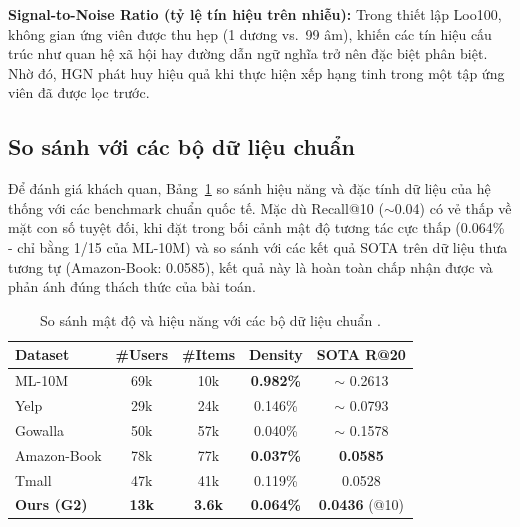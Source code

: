 \documentclass[11pt]{article}
\newcommand{\tabref}[1]{Bảng~\ref{#1}}
\begin{document}
\textbf{Signal-to-Noise Ratio (tỷ lệ tín hiệu trên nhiễu):}
Trong thiết lập Loo100, không gian ứng viên được thu hẹp (1 dương vs.\ 99 âm),
khiến các tín hiệu cấu trúc như quan hệ xã hội hay đường dẫn ngữ nghĩa
trở nên đặc biệt phân biệt.
Nhờ đó, HGN phát huy hiệu quả khi thực hiện xếp hạng tinh trong
một tập ứng viên đã được lọc trước.

\subsection{So sánh với các bộ dữ liệu chuẩn}
Để đánh giá khách quan, \tabref{tab:dataset-comparison} so sánh hiệu năng và đặc tính dữ liệu của hệ thống với các benchmark chuẩn quốc tế. Mặc dù Recall@10 ($\sim$0.04) có vẻ thấp về mặt con số tuyệt đối, khi đặt trong bối cảnh mật độ tương tác cực thấp (0.064\% - chỉ bằng 1/15 của ML-10M) và so sánh với các kết quả SOTA trên dữ liệu thưa tương tự (Amazon-Book: 0.0585), kết quả này là hoàn toàn chấp nhận được và phản ánh đúng thách thức của bài toán.

\begin{table}[!htbp]
    \centering
    \footnotesize
    \setlength{\tabcolsep}{3.4pt}
    \begin{tabular}{l|c|c|c|c}
        \toprule
        \textbf{Dataset}   & \textbf{\#Users} & \textbf{\#Items} & \textbf{Density} & \textbf{SOTA R@20}    \\
        \midrule
        ML-10M             & 69k              & 10k              & \textbf{0.982\%} & $\sim$ 0.2613         \\
        Yelp               & 29k              & 24k              & 0.146\%          & $\sim$ 0.0793         \\
        Gowalla            & 50k              & 57k              & 0.040\%          & $\sim$ 0.1578         \\
        Amazon-Book        & 78k              & 77k              & \textbf{0.037\%} & \textbf{0.0585}       \\
        Tmall              & 47k              & 41k              & 0.119\%          & 0.0528                \\
        \midrule
        \textbf{Ours (G2)} & \textbf{13k}     & \textbf{3.6k}    & \textbf{0.064\%} & \textbf{0.0436} (@10) \\
        \bottomrule
    \end{tabular}
    \caption{So sánh mật độ và hiệu năng với các bộ dữ liệu chuẩn \citet{he2020lightgcn, yu2022graph}.}
    \label{tab:dataset-comparison}
\end{table}
\end{document}
